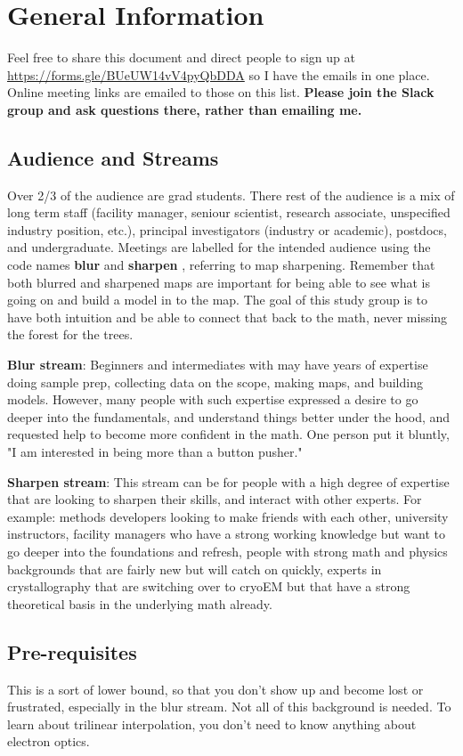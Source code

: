 \documentclass[11pt, oneside]{article}   	%
\begin{document}
\pagebreak
\section{General Information}

Feel free to share this document and direct people to sign up at \url{https://forms.gle/BUeUW14vV4pyQbDDA} so I have the emails in one place. Online meeting links are emailed to those on this list. {\bf Please join the Slack group and ask questions there, rather than emailing me.}

\subsection{Audience and Streams}
Over 2/3 of the audience are grad students. There rest of the audience is a mix of long term staff (facility manager, seniour scientist, research associate, unspecified industry position, etc.), principal investigators (industry or academic), postdocs, and undergraduate. Meetings are labelled for the intended audience using the code names {\bf blur} and {\bf sharpen} , referring to map sharpening. Remember that both blurred and sharpened maps are important for being able to see what is going on and build a model in to the map. The goal of this study group is to have both intuition and be able to connect that back to the math, never missing the forest for the trees.

{\bf  Blur stream}: Beginners and intermediates with may have years of expertise doing sample prep, collecting data on the scope, making maps, and building models. However, many people with such expertise expressed a desire to go deeper into the fundamentals, and understand things better under the hood, and requested help to become more confident in the math. One person put it bluntly, "I am interested in being more than a button pusher."

{\bf Sharpen stream}: This stream can be for people with a high degree of expertise that are looking to sharpen their skills, and interact with other experts. For example: methods developers looking to make friends with each other, university instructors, facility managers who have a strong working knowledge but want to go deeper into the foundations and refresh, people with strong math and physics backgrounds that are fairly new but will catch on quickly, experts in crystallography that are switching over to cryoEM but that have a strong theoretical basis in the underlying math already.

\subsection{Pre-requisites}
This is a sort of lower bound, so that you don't show up and become lost or frustrated, especially in the blur stream. Not all of this background is needed. To learn about trilinear interpolation, you don't need to know anything about electron optics.
\end{document}
